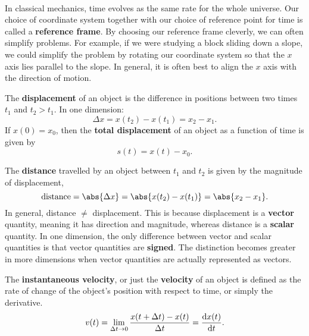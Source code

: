 \documentclass[../classical_mechanics.tex]{subfiles}
\begin{document}
        \paragraph{}
        In classical mechanics, time evolves as the same rate for the whole universe.
        Our choice of coordinate system together with our choice of reference point for time is called a \textbf{reference frame}.
        By choosing our reference frame cleverly, we can often simplify problems.
        For example, if we were studying a block sliding down a slope, we could simplify the problem by rotating our coordinate system so that the $x$ axis lies parallel to the slope.
        In general, it is often best to align the $x$ axis with the direction of motion.
        \begin{definition}
            The \textbf{displacement} of an object is the difference in positions between two times $t_1$ and $t_2>t_1$. In one dimension:
            \begin{equation}
                \Delta x=x(t_2)-x(t_1)=x_2-x_1.
            \end{equation}
            If $x(0)=x_0$, then the \textbf{total displacement} of an object as a function of time is given by
            \begin{equation}
                s(t)=x(t)-x_0.
            \end{equation}
        \end{definition}
        The \textbf{distance} travelled by an object between $t_1$ and $t_2$ is given by the magnitude of displacement,
        \begin{equation}
            \mathrm{distance}=\abs{\Delta x}=\abs{x(t_2)-x(t_1)}=\abs{x_2-x_1}.
        \end{equation}
        In general, distance $\neq$ displacement.
        This is because displacement is a \textbf{vector} quantity, meaning it has direction and magnitude, whereas distance is a \textbf{scalar} quantity.
        In one dimension, the only difference between vector and scalar quantities is that vector quantities are \textbf{signed}.
        The distinction becomes greater in more dimensions when vector quantities are actually represented as vectors.
        \begin{definition}
            The \textbf{instantaneous velocity}, or just the \textbf{velocity} of an object is defined as the rate of change of the object's position with respect to time, or simply the derivative.
            \begin{equation}
                v(t)=\lim_{\Delta t\to0}\frac{x(t+\Delta t)-x(t)}{\Delta t}=\dv{x(t)}{t}.
            \end{equation}
        \end{definition}
\end{document}
